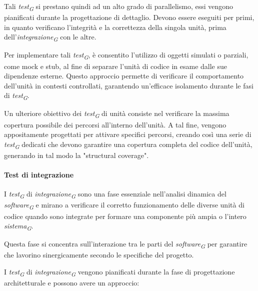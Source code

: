 Tali \textit{test}\textsubscript{\textit{G}} si prestano quindi ad un alto grado di parallelismo, essi vengono pianificati durante la progettazione di dettaglio.
Devono essere eseguiti per primi, in quanto verificano l’integrità e la correttezza della singola unità, prima dell’\textit{integrazione}\textsubscript{\textit{G}} con le altre. 

\vspace{0.2cm}

Per implementare tali \textit{test}\textsubscript{\textit{G}}, è consentito l'utilizzo di oggetti simulati o parziali, come mock e stub, al fine di separare l'unità di codice in esame dalle sue dipendenze esterne. Questo approccio permette di verificare il comportamento dell'unità in contesti controllati, garantendo un'efficace isolamento durante le fasi di \textit{test}\textsubscript{\textit{G}}.

\vspace{0.2cm}

Un ulteriore obiettivo dei \textit{test}\textsubscript{\textit{G}} di unità consiste nel verificare la massima copertura possibile dei percorsi all'interno dell'unità. A tal fine, vengono appositamente progettati per attivare specifici percorsi, creando così una serie di \textit{test}\textsubscript{\textit{G}} dedicati che devono garantire una copertura completa del codice dell'unità, generando in tal modo la "structural coverage".
 
\paragraph{Test di integrazione}
I \textit{test}\textsubscript{\textit{G}} di \textit{integrazione}\textsubscript{\textit{G}} sono una fase essenziale nell'analisi dinamica del \textit{software}\textsubscript{\textit{G}} e mirano a verificare il corretto funzionamento delle diverse unità di codice quando sono integrate per formare una componente più ampia o l'intero \textit{sistema}\textsubscript{\textit{G}}. 

\vspace{0.2cm}

Questa fase si concentra sull'interazione tra le parti del \textit{software}\textsubscript{\textit{G}} per garantire che lavorino sinergicamente secondo le specifiche del progetto.

I \textit{test}\textsubscript{\textit{G}} di \textit{integrazione}\textsubscript{\textit{G}} vengono pianificati durante la fase di progettazione architetturale e possono avere un approccio: 

